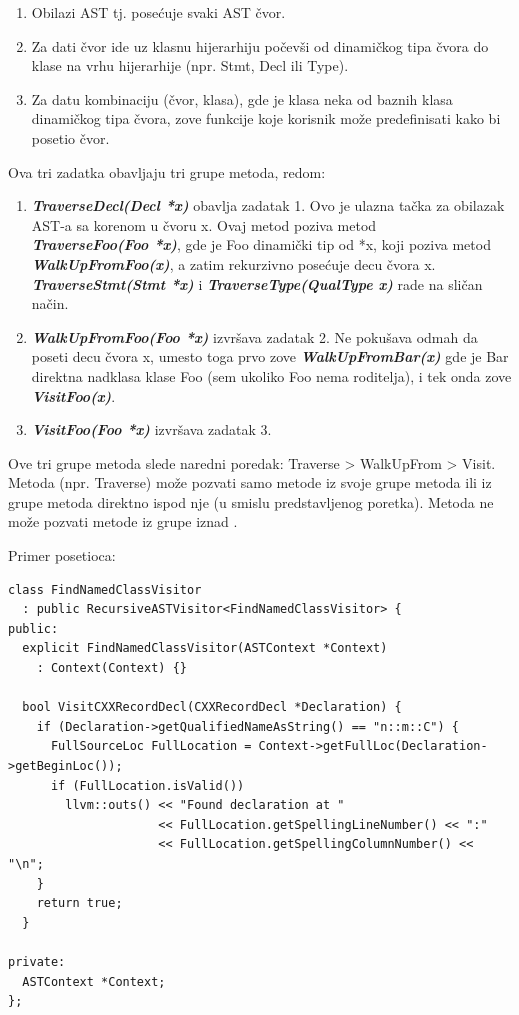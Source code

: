 \documentclass[12pt,oneside]{memoir}
\begin{document}
\begin{enumerate}
\item Obilazi AST tj. posećuje svaki AST čvor.
\item Za dati čvor ide uz klasnu hijerarhiju počevši od dinamičkog tipa čvora do klase na vrhu hijerarhije (npr. Stmt, Decl ili Type).
\item Za datu kombinaciju (čvor, klasa), gde je klasa neka od baznih klasa dinamičkog tipa čvora, zove funkcije koje korisnik može predefinisati kako bi posetio čvor.
\end{enumerate}
Ova tri zadatka obavljaju tri grupe metoda, redom:
\begin{enumerate}
\item \textbf{\textit{TraverseDecl(Decl *x)}} obavlja zadatak 1. Ovo je ulazna tačka za obilazak AST-a sa korenom u čvoru x. Ovaj metod poziva metod \\ \textbf{\textit{TraverseFoo(Foo *x)}}, gde je Foo dinamički tip od *x, koji poziva metod \\ \textbf{\textit{WalkUpFromFoo(x)}}, a zatim rekurzivno posećuje decu čvora x. \\ \textbf{\textit{TraverseStmt(Stmt *x)}} i \textbf{\textit{TraverseType(QualType x)}} rade na sličan način.
 
\item \textbf{\textit{WalkUpFromFoo(Foo *x)}} izvršava zadatak 2. Ne pokušava odmah da poseti decu čvora x, umesto toga prvo zove \textbf{\textit{WalkUpFromBar(x)}} gde je Bar direktna nadklasa klase Foo (sem ukoliko Foo nema roditelja), i tek onda zove \textbf{\textit{VisitFoo(x)}}.
\item \textbf{\textit{VisitFoo(Foo *x)}} izvršava zadatak 3.
\end{enumerate}
Ove tri grupe metoda slede naredni poredak: Traverse > WalkUpFrom > Visit. Metoda (npr. Traverse) može pozvati samo metode iz svoje grupe metoda ili iz grupe metoda direktno ispod nje (u smislu predstavljenog poretka). Metoda ne može pozvati metode iz grupe iznad \cite{visitors}. \begin{primer}
Primer posetioca:
\end{primer}
\begin{lstlisting}[caption={Primer posetioca koji posećuje sve strukture, unije i klase i ispisuje lokaciju onih koji se zovu n::m::C },frame=single, label=simple]
class FindNamedClassVisitor
  : public RecursiveASTVisitor<FindNamedClassVisitor> {
public:
  explicit FindNamedClassVisitor(ASTContext *Context)
    : Context(Context) {}

  bool VisitCXXRecordDecl(CXXRecordDecl *Declaration) {
    if (Declaration->getQualifiedNameAsString() == "n::m::C") {
      FullSourceLoc FullLocation = Context->getFullLoc(Declaration->getBeginLoc());
      if (FullLocation.isValid())
        llvm::outs() << "Found declaration at "
                     << FullLocation.getSpellingLineNumber() << ":"
                     << FullLocation.getSpellingColumnNumber() << "\n";
    }
    return true;
  }

private:
  ASTContext *Context;
};
\end{lstlisting}
\end{document}
